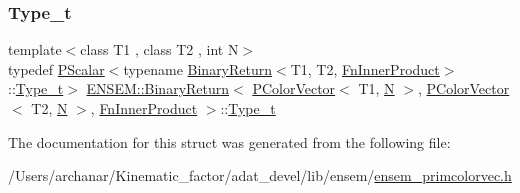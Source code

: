 \subsubsection{\texorpdfstring{Type\_t}{Type\_t}\hspace{0.1cm}{\footnotesize\ttfamily [2/2]}}
{\footnotesize\ttfamily template$<$class T1 , class T2 , int N$>$ \\
typedef \mbox{\hyperlink{classENSEM_1_1PScalar}{P\+Scalar}}$<$typename \mbox{\hyperlink{structENSEM_1_1BinaryReturn}{Binary\+Return}}$<$T1, T2, \mbox{\hyperlink{structENSEM_1_1FnInnerProduct}{Fn\+Inner\+Product}}$>$\+::\mbox{\hyperlink{structENSEM_1_1BinaryReturn_3_01PColorVector_3_01T1_00_01N_01_4_00_01PColorVector_3_01T2_00_01N_01_4_00_01FnInnerProduct_01_4_aebde22d427d8c8bc7f138930113d34b5}{Type\+\_\+t}}$>$ \mbox{\hyperlink{structENSEM_1_1BinaryReturn}{E\+N\+S\+E\+M\+::\+Binary\+Return}}$<$ \mbox{\hyperlink{classENSEM_1_1PColorVector}{P\+Color\+Vector}}$<$ T1, \mbox{\hyperlink{operator__name__util_8cc_a7722c8ecbb62d99aee7ce68b1752f337}{N}} $>$, \mbox{\hyperlink{classENSEM_1_1PColorVector}{P\+Color\+Vector}}$<$ T2, \mbox{\hyperlink{operator__name__util_8cc_a7722c8ecbb62d99aee7ce68b1752f337}{N}} $>$, \mbox{\hyperlink{structENSEM_1_1FnInnerProduct}{Fn\+Inner\+Product}} $>$\+::\mbox{\hyperlink{structENSEM_1_1BinaryReturn_3_01PColorVector_3_01T1_00_01N_01_4_00_01PColorVector_3_01T2_00_01N_01_4_00_01FnInnerProduct_01_4_aebde22d427d8c8bc7f138930113d34b5}{Type\+\_\+t}}}



The documentation for this struct was generated from the following file\+:\begin{DoxyCompactItemize}
\item 
/\+Users/archanar/\+Kinematic\+\_\+factor/adat\+\_\+devel/lib/ensem/\mbox{\hyperlink{lib_2ensem_2ensem__primcolorvec_8h}{ensem\+\_\+primcolorvec.\+h}}\end{DoxyCompactItemize}
